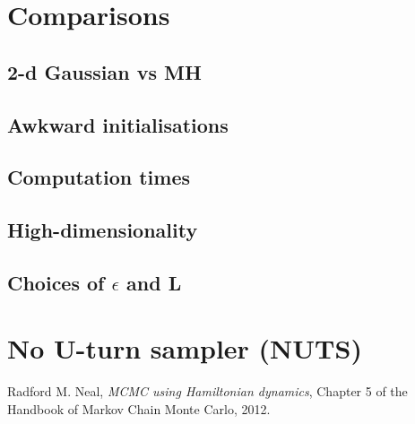 \documentclass[11pt]{article}
\begin{document}
\section{Comparisons}
\subsection{2-d Gaussian vs MH}
\subsection{Awkward initialisations}
\subsection{Computation times}
\subsection{High-dimensionality}
\subsection{Choices of $\epsilon$ and L}

\section{No U-turn sampler (NUTS)}

\begin{thebibliography}{9}

  Radford M. Neal,
  \emph{MCMC using Hamiltonian dynamics},
  Chapter 5 of the Handbook of Markov Chain Monte Carlo,
  2012.

\end{thebibliography}
\end{document}
